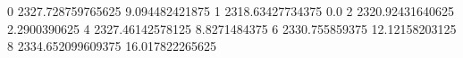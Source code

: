 0 2327.728759765625 9.094482421875
1 2318.63427734375 0.0
2 2320.92431640625 2.2900390625
4 2327.46142578125 8.8271484375
6 2330.755859375 12.12158203125
8 2334.652099609375 16.017822265625
